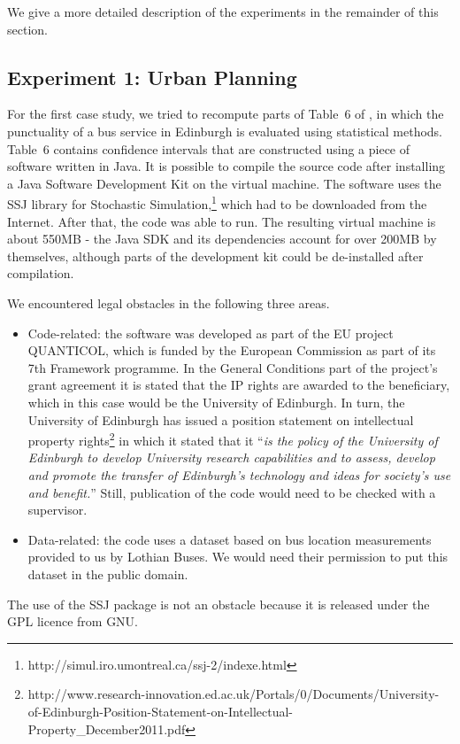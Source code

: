 We give a more detailed description of the experiments in the remainder of this section.

\subsection*{Experiment 1: Urban Planning}

For the first case study, we tried to recompute parts of Table~6 of \cite{danielpaper}, in which the punctuality of a bus service in Edinburgh is evaluated using statistical methods. Table~6 contains confidence intervals that are constructed using a piece of software written in Java. It is possible to compile the source code after installing a Java Software Development Kit on the virtual machine. The software uses the SSJ library for Stochastic Simulation,\footnote{http://simul.iro.umontreal.ca/ssj-2/indexe.html} which had to be downloaded from the Internet. After that, the code was able to run.
The resulting virtual machine is about 550MB - the Java SDK and its dependencies account for over 200MB by themselves, although parts of the development kit could be de-installed after compilation.

We encountered legal obstacles in the following three areas.
\begin{itemize} 
\item Code-related: the software was developed as part of the EU project QUANTICOL, which is funded by the European Commission as part of its 7th Framework programme. In the General Conditions part of the project's grant agreement it is stated that the IP rights are awarded to the beneficiary, which in this case would be the University of Edinburgh. In turn, the University of Edinburgh has issued a position statement on intellectual property rights\footnote{http://www.research-innovation.ed.ac.uk/Portals/0/Documents/University-of-Edinburgh-Position-Statement-on-Intellectual-Property\_December2011.pdf} in which it stated that it ``\emph{is the policy of the University of Edinburgh to develop University research capabilities and to assess, develop and promote the transfer of Edinburgh's technology and ideas for society's use and benefit.}'' Still, publication of the code would need to be checked with a supervisor.
\item Data-related: the code uses a dataset based on bus location measurements provided to us by Lothian Buses. We would need their permission to put this dataset in the public domain.
\end{itemize}
The use of the SSJ package is not an obstacle because it is released under the GPL licence from GNU.

